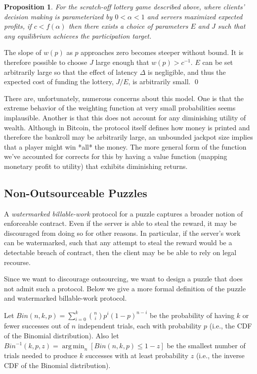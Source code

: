 \documentclass[]{article}
\newtheorem{proposition}{Proposition}
\theoremstyle{remark}
\DeclareMathOperator*{\ArgMin}{arg\,min}
\newcommand{\argmin}[1]{\displaystyle{\ArgMin_{#1}}}
\begin{document}
\begin{proposition}
For the scratch-off lottery game described above, where clients' decision making is parameterized by $0 < α < 1$ and servers maximized expected profits, if $c < f(α)$ then there exists a choice of parameters $E$ and $J$ such that any equilibrium achieves the participation target.
\end{proposition}
\proof 
  The slope of $w(p)$ as $p$ approaches zero becomes steeper without bound. It is therefore possible to choose $J$ large enough that $w(p)>c^{-1}$. $E$ can be set arbitrarily large so that the effect of latency $Δ$ is negligible, and thus the expected cost of funding the lottery, $J/E$, is arbitrarily small.
\qed

There are, unfortunately, numerous concerns about this model. One is that the extreme behavior of the weighting function at very small probabilities seems implausible. Another is that this does not account for any diminishing utility of wealth. Although in Bitcoin, the protocol itself defines how money is printed and therefore the bankroll may be arbitrarily large, an unbounded jackpot size implies that a player might win *all* the money. The more general form of the function we've accounted for corrects for this by having a value function (mapping monetary profit to utility) that exhibits diminishing returns.




\subsection{Non-Outsourceable Puzzles}

A {\em watermarked billable-work} protocol for a puzzle captures a broader notion of enforceable contract. Even if the server is able to steal the reward, it may be discouraged from doing so for other reasons. In particular, if the server's work can be watermarked, such that any attempt to steal the reward would be a detectable breach of contract, then the client may be be able to rely on legal recourse.

Since we want to discourage outsourcing, we want to design a puzzle that does not admit such a protocol. Below we give a more formal definition of the puzzle and watermarked billable-work protocol.

Let $Bin(n,k,p) = \sum^k_{i=0}{n \choose i}p^i(1-p)^{n-i}$ be the probability of having $k$ or fewer successes out of $n$ independent trials, each with probability $p$ (i.e., the CDF of the Binomial distribution). Also let $Bin^{-1}(k,p,z) = \argmin{n}\left[Bin(n,k,p) ≤ 1-z \right]$ be the smallest number of trials needed to produce $k$ successes with at least probability $z$ (i.e., the inverse CDF of the Binomial distribution).
\end{document}

